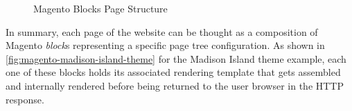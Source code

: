 \vspace{0.5cm}
\begin{figure}[H]
  \centering
  \qquad
  \caption{Magento Blocks Page Structure}%
  \label{fig:magento-term-blocks}%
\end{figure}


In summary, each page of the website can be thought as a composition of Magento \textit{block}s representing a specific page tree configuration. As shown in \ref{fig:magento-madison-island-theme} for the Madison Island theme example, each one of these blocks holds its associated rendering template that gets assembled and internally rendered before being returned to the user browser in the HTTP response.

